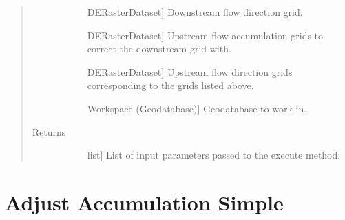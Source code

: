\documentclass[letterpaper,10pt,english]{sphinxmanual}
\begin{document}
\begin{fulllineitems}
\begin{fulllineitems}
\begin{quote}
\begin{description}
\begin{description}
\item[{}] \leavevmode{[}DERasterDataset{]}
Downstream flow direction grid.

\item[{}] \leavevmode{[}DERasterDataset{]}
Upstream flow accumulation grids to correct the downstream grid with.

\item[{}] \leavevmode{[}DERasterDataset{]}
Upstream flow direction grids corresponding to the grids listed above.

\item[{}] \leavevmode{[}Workspace (Geodatabase){]}
Geodatabase to work in.

\end{description}

\item[{Returns}] \leavevmode\begin{description}
\item[{}] \leavevmode{[}list{]}
List of input parameters passed to the execute method.

\end{description}

\end{description}\end{quote}

\end{fulllineitems}


\end{fulllineitems}



\section{Adjust Accumulation Simple}
\label{\detokenize{StreamStats_DataPrep:adjust-accumulation-simple}}
\end{document}

